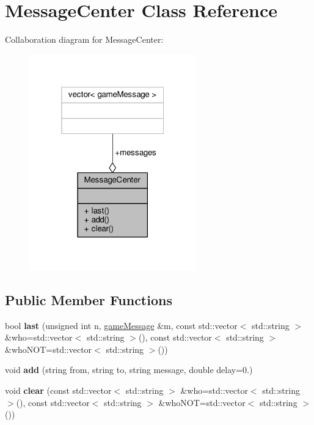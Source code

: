 \hypertarget{classMessageCenter}{}\section{Message\+Center Class Reference}
\label{classMessageCenter}


Collaboration diagram for Message\+Center\+:
\nopagebreak
\begin{figure}[H]
\begin{center}
\leavevmode
\includegraphics[width=205pt]{df/d8a/classMessageCenter__coll__graph}
\end{center}
\end{figure}
\subsection*{Public Member Functions}
\begin{DoxyCompactItemize}
\item 
bool {\bfseries last} (unsigned int n, \hyperlink{classgameMessage}{game\+Message} \&m, const std\+::vector$<$ std\+::string $>$ \&who=std\+::vector$<$ std\+::string $>$(), const std\+::vector$<$ std\+::string $>$ \&who\+N\+OT=std\+::vector$<$ std\+::string $>$())\hypertarget{classMessageCenter_a6040780a7138b0e16673b2f6b3201085}{}\label{classMessageCenter_a6040780a7138b0e16673b2f6b3201085}

\item 
void {\bfseries add} (string from, string to, string message, double delay=0.)\hypertarget{classMessageCenter_abe385ba070376a87a5a973aa4ab8c26f}{}\label{classMessageCenter_abe385ba070376a87a5a973aa4ab8c26f}

\item 
void {\bfseries clear} (const std\+::vector$<$ std\+::string $>$ \&who=std\+::vector$<$ std\+::string $>$(), const std\+::vector$<$ std\+::string $>$ \&who\+N\+OT=std\+::vector$<$ std\+::string $>$())\hypertarget{classMessageCenter_a9522399460ae10a1904e320e5bbc40e1}{}\label{classMessageCenter_a9522399460ae10a1904e320e5bbc40e1}

\end{DoxyCompactItemize}
